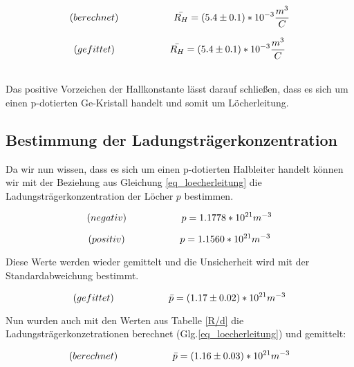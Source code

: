 \documentclass[12pt, a4paper]{article}
\begin{document}
\begin{equation*}
   (berechnet) \hspace{2.0cm} \Bar{R_H} = (5.4 \pm 0.1) *10^{-3} \frac{m^3}{C} 
\end{equation*}

\begin{equation*}
   (gefittet) \hspace{2.0cm} \Bar{R_H} = (5.4 \pm 0.1) *10^{-3} \frac{m^3}{C}
\end{equation*}

\\
Das positive Vorzeichen der Hallkonstante lässt darauf schließen, dass es sich um einen p-dotierten Ge-Kristall handelt und somit um Löcherleitung.

\subsection{Bestimmung der Ladungsträgerkonzentration}

Da wir nun wissen, dass es sich um einen p-dotierten Halbleiter handelt können wir mit der Beziehung aus Gleichung \ref{eq_loecherleitung} die Ladungsträgerkonzentration der Löcher $p$ bestimmen.

\begin{equation*}
    (negativ) \hspace{2.0cm} p = 1.1778 * 10^{21} m^{-3}
\end{equation*}

\begin{equation*}
    (positiv) \hspace{2.0cm} p = 1.1560 * 10^{21} m^{-3}
\end{equation*}

Diese Werte werden wieder gemittelt und die Unsicherheit wird mit der Standardabweichung bestimmt.

\begin{equation*}
   (gefittet) \hspace{2.0cm} \Bar{p} = (1.17 \pm 0.02) * 10^{21} m^{-3}
\end{equation*}

Nun wurden auch mit den Werten aus Tabelle \ref{R/d} die Ladungsträgerkonzetrationen berechnet (Glg.\ref{eq_loecherleitung}) und gemittelt:

\begin{equation*}
    (berechnet) \hspace{2.0cm} \Bar{p} = (1.16 \pm 0.03) * 10^{21} m^{-3}
\end{equation*}
\end{document}
